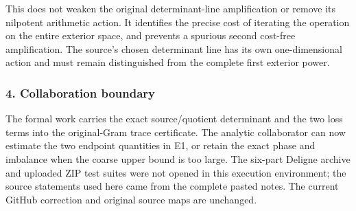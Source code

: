 This does not weaken the original determinant-line amplification or remove its nilpotent arithmetic action. It identifies the precise cost of iterating the operation on the entire exterior space, and prevents a spurious second cost-free amplification. The source's chosen determinant line has its own one-dimensional action and must remain distinguished from the complete first exterior power.

\subsubsection{4. Collaboration boundary}\label{endpoint-pr23_original--collaboration-boundary}

The formal work carries the exact source/quotient determinant and the two loss terms into the original-Gram trace certificate. The analytic collaborator can now estimate the two endpoint quantities in E1, or retain the exact phase and imbalance when the coarse upper bound is too large. The six-part Deligne archive and uploaded ZIP test suites were not opened in this execution environment; the source statements used here came from the complete pasted notes. The current GitHub correction and original source maps are unchanged.

